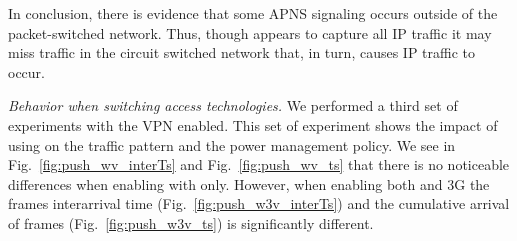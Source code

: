 In conclusion, there is evidence that some APNS signaling occurs 
outside of the packet-switched network. Thus, though \meddle appears 
to capture all IP traffic it may miss traffic in the circuit switched network 
that, in turn, causes IP traffic to occur.






\emph{Behavior when switching access technologies.} We performed a third set of experiments with the VPN enabled. This set
of experiment shows the impact of using \meddle on the traffic pattern
and the power management policy. We see in
Fig.~\ref{fig:push_wv_interTs} and Fig.~\ref{fig:push_wv_ts} that
there is no noticeable differences when enabling \meddle with \wifi{} only. However,
when enabling both \wifi and 3G the frames interarrival time
(Fig.~\ref{fig:push_w3v_interTs}) and the cumulative arrival of frames
(Fig.~\ref{fig:push_w3v_ts}) is significantly different. 

